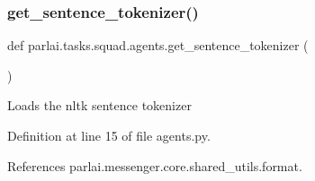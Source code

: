 \subsubsection{\texorpdfstring{get\+\_\+sentence\+\_\+tokenizer()}{get\_sentence\_tokenizer()}}
{\footnotesize\ttfamily def parlai.\+tasks.\+squad.\+agents.\+get\+\_\+sentence\+\_\+tokenizer (\begin{DoxyParamCaption}{ }\end{DoxyParamCaption})}

\begin{DoxyVerb}Loads the nltk sentence tokenizer
\end{DoxyVerb}
 

Definition at line 15 of file agents.\+py.



References parlai.\+messenger.\+core.\+shared\+\_\+utils.\+format.

